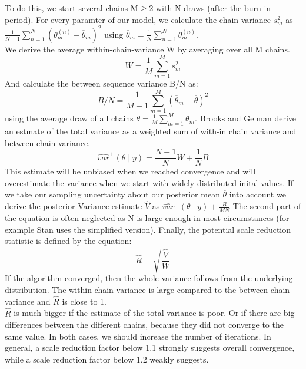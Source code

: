 To do this, we start several chains M$\geq$2 with N draws (after the burn-in period). 
For every paramter of our model, we calculate the chain variance $s_m^2$ as $\frac{1}{N-1}\sum_{n=1}^{N} (\theta_m^{(n)}-\overline{\theta}_m )^2$ using $\overline{\theta}_m=\frac{1}{N} \sum_{n=1}^{N} \theta_m^{(n)}$.\\
We derive the average within-chain-variance W by averaging over all M chains.\\
$$W=\frac{1}{M} \sum_{m=1}^{M} s_m^2 $$ 
And calculate the between sequence variance B/N as:
$$B/N=\frac{1}{M-1} \sum_{m=1}^{M} (\overline{\theta}_m-\overline{\theta} )^2 $$
using the average draw of all chains $\overline{\theta}=\frac{1}{M} \sum_{m=1}^{M} \theta_m$.
Brooks and Gelman derive an estmate of the total variance as a weighted sum of with-in chain variance and between chain variance.
$$\widehat{var}^+ (\theta \mid y)=\frac{N-1}{N}W+\frac{1}{N}B$$
This estimate will be unbiased when we reached convergence and will overestimate the variance when we start with widely distributed inital values.
If we take our sampling uncertainty about our posterior mean $\overline{\theta} $ into account we derive the posterior Variance estimate $\widehat{V}$ as $\widehat{var}^+ (\theta \mid y) +\frac{B}{MN}$ \cite{brooks1998}
The second part of the equation is often neglected as N is large enough in most circumstances (for example Stan uses the simplified version).
Finally, the potential scale reduction statistic is defined by the equation:
$$\widehat{R}=\sqrt{\frac{\widehat{V}}{W}}$$
If the algorithm converged, then the whole variance follows from the underlying distribution. The within-chain variance is large compared to the between-chain variance and $ \widehat{R}$ is close to 1.\\
$\widehat{R}$ is much bigger if the estimate of the total variance is poor. Or if there are big differences between the different chains, because they did not converge to the same value.  In both cases, we should increase the number of iterations. In general, a scale reduction factor below 1.1 strongly suggests overall convergence, while a scale reduction factor below 1.2 weakly suggests.\cite{brooks1998}



